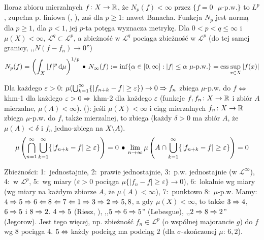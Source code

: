 Iloraz  zbioru mierzalnych $f \colon X \to \mathbb{R}$, że $N_p(f) < \infty$ przez $\{f = 0 \textrm{ $\mu$-p.w.}\}$ to $L^p$, zupełna p. liniowa (, ), zaś dla $p \ge 1$: nawet Banacha.
Funkcja $N_p$ jest normą dla $p \ge 1$, dla $p <1$, jej $p$-ta potęga wyznacza metrykę.
Dla $0 < p < q \le \infty$ i $\mu (X) < \infty$, $\mathcal L^q \subset \mathcal L^p$, a zbieżność w $\mathcal L^q$ pociąga zbieżność w $\mathcal L^p$ (do tej samej granicy, ,,$N(f - f_n) \to 0$'')
\[
	N_p(f) = \left(\int_X |f|^p \,\textrm{d}\mu\right)^{1/p} \, \bullet \,
	N_\infty(f) := \inf \{\alpha \in [0, \infty] : |f| \le \alpha \textrm{ $\mu$-p.w.}\} = \operatorname{ess} \sup_{x \in X} |f(x)|
\]

Dla  każdego $\varepsilon > 0$: $\mu (\bigcup_{k=1}^\infty \{|f_{n+k} - f| \ge \varepsilon \}) \to 0 \Rightarrow f_n$ zbiega $\mu$-p.w. do $f$ $\Leftrightarrow$ khm-1 dla każdego $\varepsilon > 0 \Rightarrow$ khm-2 dla każdego $\varepsilon$ (funkcje $f, f_n \colon X \to \mathbb{R}$ i zbiór $A$ mierzalne, $\mu(A) < \infty$).
 (): jeśli $\mu(X) < \infty$ i ciąg mierzalnych $f_n \colon X \to \mathbb{R}$ zbiega $\mu$-p.w. do $f$, także mierzalnej, to zbiega  (każdy $\delta > 0$ ma zbiór $A$, że $\mu(A) < \delta$ i $f_n$ jedno-zbiega na $X \setminus A$).
\[
	\mu \left( \bigcap_{n=1}^\infty \bigcup_{k=1}^\infty \{|f_{n+k} - f| \ge \varepsilon\}\right) = 0 \, \bullet \,
	\lim_{n \to \infty} \mu \left(A \cap \bigcup_{k=1}^\infty \{|f_{n+k}-f| \ge \varepsilon\}\right) = 0
\]

Zbieżności: 
1:~jednostajnie,
2:~prawie jednostajnie, 
3:~p.w. jednostajnie (w $\mathcal L^\infty$), 
4:~w $\mathcal L^p$, 
5:~wg miary ($\varepsilon > 0$ pociąga $\mu\{|f_n - f| \ge \varepsilon\} \to 0$), 
6:~lokalnie wg miary (wg miary na każdym zbiorze $A$, że $\mu(A) < \infty$), 
7:~punktowo
8:~$\mu$-p.w.
Mamy: $4 \Rightarrow 5 \Rightarrow 6 \Leftarrow 8 \Leftarrow 7 \Leftarrow 1 \Rightarrow 3 \Rightarrow 2 \Rightarrow 5, 8$, a gdy $\mu(X) < \infty$, to także $3 \Rightarrow 4$, $6 \Rightarrow 5$ i $8 \Rightarrow 2$.
$4 \Rightarrow 5$ (Riesz, ), ,,$5 \Rightarrow 6 \Rightarrow 5$'' (Lebesgue), ,,$2 \Rightarrow 8 \Rightarrow 2$'' (Jegorow).
Jest tego więcej, np. zbieżność $f_n \in \mathcal L^p$ (o wspólnej majorancie $g$) do $f$ wg $8$ pociąga $4$.
$5 \Leftrightarrow$ każdy podciąg ma podciąg $2$ (dla $\sigma$-skończonej $\mu$: $6, 2$).

